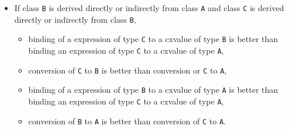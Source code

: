 \begin{itemize}
  \item If class \texttt{B} is derived directly or indirectly from class
  \texttt{A} and class \texttt{C} is derived directly or indirectly from class
  \texttt{B},
  \begin{itemize}
    \item binding of a expression of type \texttt{C} to a cxvalue of type
    \texttt{B} is better than binding an expression of type \texttt{C} to a
    cxvalue of type \texttt{A},
    \item conversion of \texttt{C} to \texttt{B} is better than conversion or
    \texttt{C} to \texttt{A},
    \item binding of a expression of type \texttt{B} to a cxvalue of type
    \texttt{A} is better than binding an expression of type \texttt{C} to a
    cxvalue of type \texttt{A},
    \item conversion of \texttt{B} to \texttt{A} is better than conversion of
    \texttt{C} to \texttt{A}.
  \end{itemize}
\end{itemize}
